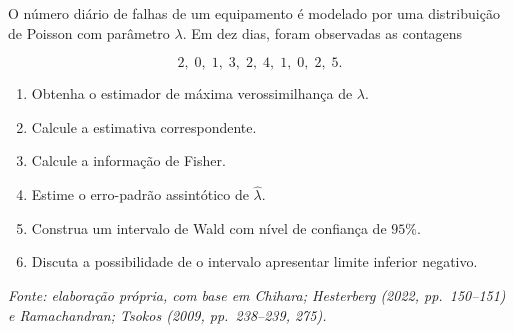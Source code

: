 \documentclass[
  letterpaper,
  DIV=11,
  numbers=noendperiod]{scrreprt}
\providecommand{\tightlist}{%
  \setlength{\itemsep}{0pt}\setlength{\parskip}{0pt}}\usepackage{longtable,booktabs,array}
\begin{document}
\begin{tcolorbox}[enhanced jigsaw, colback=white, leftrule=.75mm, colbacktitle=quarto-callout-tip-color!10!white, breakable, titlerule=0mm, bottomtitle=1mm, title=\textcolor{quarto-callout-tip-color}{\faLightbulb}\hspace{0.5em}{Exercício 2 --- Contagens de Poisson}, colframe=quarto-callout-tip-color-frame, toprule=.15mm, opacityback=0, bottomrule=.15mm, opacitybacktitle=0.6, arc=.35mm, toptitle=1mm, rightrule=.15mm, coltitle=black, left=2mm]

O número diário de falhas de um equipamento é modelado por uma
distribuição de Poisson com parâmetro \(\lambda\). Em dez dias, foram
observadas as contagens

\[2,\;0,\;1,\;3,\;2,\;4,\;1,\;0,\;2,\;5.\]

\begin{enumerate}
\def\labelenumi{\arabic{enumi}.}
\tightlist
\item
  Obtenha o estimador de máxima verossimilhança de \(\lambda\).
\item
  Calcule a estimativa correspondente.
\item
  Calcule a informação de Fisher.
\item
  Estime o erro-padrão assintótico de \(\widehat\lambda\).
\item
  Construa um intervalo de Wald com nível de confiança de \(95\%\).
\item
  Discuta a possibilidade de o intervalo apresentar limite inferior
  negativo.
\end{enumerate}

\emph{Fonte: elaboração própria, com base em Chihara; Hesterberg (2022,
pp.~150--151) e Ramachandran; Tsokos (2009, pp.~238--239, 275).}

\end{tcolorbox}
\end{document}
